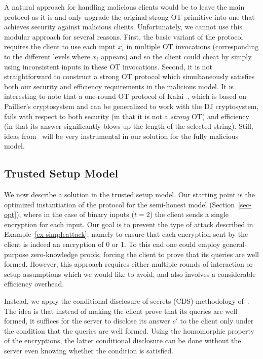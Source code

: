 \documentclass[11pt]{article}
\begin{document}
A natural approach for handling malicious clients would be to leave
the main protocol as it is and only upgrade the original strong OT
primitive into one that achieves security against malicious clients.
Unfortunately, we cannot use this modular approach for several
reasons. First, the basic variant of the protocol requires the client
to use each input $x_i$ in multiple OT invocations (corresponding to
the different levels where $x_i$ appears) and so the client could
cheat by simply using inconsistent inputs in these OT invocations.
Second, it is not straightforward to construct a strong OT protocol
which simultaneously satisfies both our security and efficiency
requirements in the malicious model. It is interesting to note that
a one-round OT protocol of Kalai~\cite{T05}, which is based on
Paillier's cryptosystem and can be generalized to work with the DJ
cryptosystem, fails with respect to both security (in that it is
not a {\em strong} OT) and efficiency (in that its answer
significantly blows up the length of the selected string). Still,
ideas from~\cite{T05} will be very instrumental in our solution for
the fully malicious model.



\subsection{Trusted Setup Model}
\label{sec-trusted}

We now describe a solution in the trusted setup model. Our starting
point is the optimized instantiation of the protocol for the
semi-honest model (Section~\ref{sec-opt}), where in the case of
binary inputs ($t=2$) the client sends a single encryption for each
input. Our goal is to prevent the type of attack described in
Example~\ref{ex-simpleattack}, namely to ensure that each
encryption sent by the client is indeed an encryption of 0 or 1. To
this end one could employ general-purpose zero-knowledge proofs,
forcing the client to prove that its queries are well formed.
However, this approach requires either multiple rounds of
interaction or setup assumptions which we would like to avoid, and
also involves a considerable efficiency overhead.

Instead, we apply the conditional disclosure of secrets (CDS)
methodology of~\cite{GIKM,AIR01}. The idea is that instead of
making the client prove that its queries are well formed, it
suffices for the server to disclose its answer $c'$ to the client
only under the condition that the queries are well formed. Using
the homomorphic property of the encryptions, the latter conditional
disclosure can be done without the server even knowing whether the
condition is satisfied.
\end{document}
